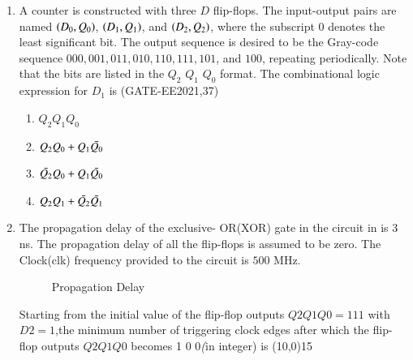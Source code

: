\begin{enumerate}[label=\arabic*.,ref=\theenumi]
%
\item A counter is constructed with three $D$ flip-flops. The input-output pairs are named $\left(D_0, Q_0\right)$, $\left(D_1, Q_1\right)$, and $\left(D_2, Q_2\right)$, where the subscript $0$ denotes the least significant bit. The output sequence is desired to be the Gray-code sequence $000, 001, 011, 010, 110, 111, 101$, and $100$, repeating periodically. Note that the bits are listed in the $Q_2$  $Q_1$  $Q_0$ format. The combinational logic expression for $D_1$ is
\hfill(GATE-EE2021,37)
%
\begin{enumerate}
    \item $Q_2 Q_1 Q_0$
    \item $Q_2 Q_0 + Q_1 \Bar{Q_0}$
    \item $\Bar{Q_2} Q_0 + Q_1 \Bar{Q_0}$
    \item $Q_2 Q_1 + \Bar{Q_2} \Bar{Q_1}$
\end{enumerate}
%
\item The propagation delay of the exclusive- OR(XOR) gate in the circuit in  
	is $3$ ns. The propagation delay of all the flip-flops is assumed to be zero. The Clock(clk) frequency provided to the circuit is $500$ MHz.
%
	\begin{figure}[H]
    \centering
    \resizebox{0.75\columnwidth}{!}{%
    
		}
    \caption{Propagation Delay}
	\label{fig:PropagationDelay}
\end{figure}
Starting from the initial value of the flip-flop outputs $Q2Q1Q0 =1 1 1$ with $D2=1$,the minimum number of triggering clock edges after which the flip-flop outputs $Q2Q1Q0$ becomes 1 0 0\emph (in integer) is \line(10,0){15}


\end{enumerate}
